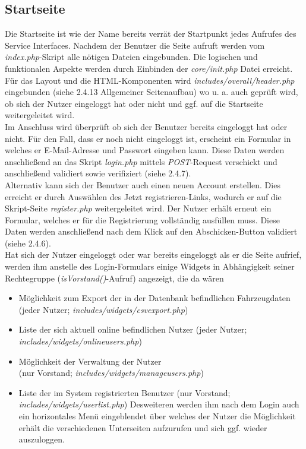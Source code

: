 \documentclass[fontsize = 12pt, paper = a4]{scrreprt}
\begin{document}
\subsection{Startseite}
Die Startseite ist wie der Name bereits verrät der Startpunkt jedes Aufrufes des Service Interfaces. Nachdem der Benutzer die Seite aufruft werden vom \textit{index.php}-Skript alle nötigen Dateien eingebunden. Die logischen und funktionalen Aspekte werden durch Einbinden der \textit{core/init.php} Datei erreicht. Für das Layout und die HTML-Komponenten wird \textit{includes/overall/header.php} eingebunden (siehe 2.4.13 Allgemeiner Seitenaufbau) wo u. a. auch geprüft wird, ob sich der Nutzer eingeloggt hat oder nicht und ggf. auf die Startseite weitergeleitet wird.\\
Im Anschluss wird überprüft ob sich der Benutzer bereits eingeloggt hat oder nicht. Für den Fall, dass er noch nicht eingeloggt ist, erscheint ein Formular in welches er E-Mail-Adresse und Passwort eingeben kann. Diese Daten werden anschließend an das Skript \textit{login.php} mittels \textit{POST}-Request verschickt und anschließend validiert sowie verifiziert (siehe 2.4.7).\\
Alternativ kann sich der Benutzer auch einen neuen Account erstellen. Dies erreicht er durch Auswählen des \glqq Jetzt registrieren\grqq-Links, wodurch er auf die Skript-Seite \textit{register.php} weitergeleitet wird. Der Nutzer erhält erneut ein Formular, welches er für die Registrierung vollständig ausfüllen muss. Diese Daten werden anschließend nach dem Klick auf den Abschicken-Button validiert (siehe 2.4.6).\\
Hat sich der Nutzer eingeloggt oder war bereits eingeloggt als er die Seite aufrief, werden ihm anstelle des Login-Formulars einige Widgets in Abhängigkeit seiner Rechtegruppe (\textit{isVorstand()}-Aufruf) angezeigt, die da wären

\begin{itemize}
 \item Möglichkeit zum Export der in der Datenbank befindlichen Fahrzeugdaten (jeder Nutzer; \textit{includes/widgets/csvexport.php})
 \item Liste der sich aktuell online befindlichen Nutzer (jeder Nutzer;\\ \textit{includes/widgets/onlineusers.php})
 \item Möglichkeit der Verwaltung der Nutzer\\ (nur Vorstand; \textit{includes/widgets/manageusers.php})
 \item Liste der im System registrierten Benutzer (nur Vorstand; \textit{includes/widgets/userlist.php})
Desweiteren werden ihm nach dem Login auch ein horizontales Menü eingeblendet über welches der Nutzer die Möglichkeit erhält die verschiedenen Unterseiten aufzurufen und sich ggf. wieder auszuloggen.
\end{itemize}
\end{document}
